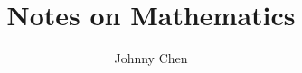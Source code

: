 \documentclass[12pt, a4paper]{ctexart}
\title{Notes on Mathematics}
\author{Johnny Chen}
\begin{document}
\titlepage
\maketitle



% 
\end{document}
